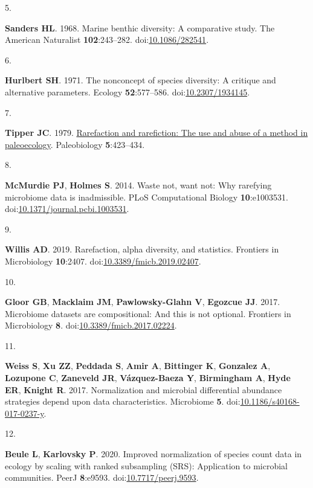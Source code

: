 \documentclass[
  11pt,
]{article}
\newlength{\cslhangindent}
\newlength{\csllabelwidth}
\newenvironment{CSLReferences}[2] %
 {\begin{list}{}{%
  \setlength{\itemindent}{0pt}
  \setlength{\leftmargin}{0pt}
  \setlength{\parsep}{0pt}
  \ifodd #1
   \setlength{\leftmargin}{\cslhangindent}
   \setlength{\itemindent}{-1\cslhangindent}
  \fi
  \setlength{\itemsep}{#2\baselineskip}}}
 {\end{list}}
\newcommand{\CSLLeftMargin}[1]{\parbox[t]{\csllabelwidth}{\strut#1\strut}}
\newcommand{\CSLRightInline}[1]{\parbox[t]{\linewidth - \csllabelwidth}{\strut#1\strut}}
\begin{document}
\begin{CSLReferences}{0}{1}
\CSLLeftMargin{5. }%
\CSLRightInline{\textbf{Sanders HL}. 1968. Marine benthic diversity: A
comparative study. The American Naturalist \textbf{102}:243--282.
doi:\href{https://doi.org/10.1086/282541}{10.1086/282541}.}

\CSLLeftMargin{6. }%
\CSLRightInline{\textbf{Hurlbert SH}. 1971. The nonconcept of species
diversity: A critique and alternative parameters. Ecology
\textbf{52}:577--586.
doi:\href{https://doi.org/10.2307/1934145}{10.2307/1934145}.}

\CSLLeftMargin{7. }%
\CSLRightInline{\textbf{Tipper JC}. 1979.
\href{http://www.jstor.org/stable/2400321}{Rarefaction and rarefiction:
The use and abuse of a method in paleoecology}. Paleobiology
\textbf{5}:423--434.}

\CSLLeftMargin{8. }%
\CSLRightInline{\textbf{McMurdie PJ}, \textbf{Holmes S}. 2014. Waste
not, want not: Why rarefying microbiome data is inadmissible. {PLoS}
Computational Biology \textbf{10}:e1003531.
doi:\href{https://doi.org/10.1371/journal.pcbi.1003531}{10.1371/journal.pcbi.1003531}.}

\CSLLeftMargin{9. }%
\CSLRightInline{\textbf{Willis AD}. 2019. Rarefaction, alpha diversity,
and statistics. Frontiers in Microbiology \textbf{10}:2407.
doi:\href{https://doi.org/10.3389/fmicb.2019.02407}{10.3389/fmicb.2019.02407}.}

\CSLLeftMargin{10. }%
\CSLRightInline{\textbf{Gloor GB}, \textbf{Macklaim JM},
\textbf{Pawlowsky-Glahn V}, \textbf{Egozcue JJ}. 2017. Microbiome
datasets are compositional: And this is not optional. Frontiers in
Microbiology \textbf{8}.
doi:\href{https://doi.org/10.3389/fmicb.2017.02224}{10.3389/fmicb.2017.02224}.}

\CSLLeftMargin{11. }%
\CSLRightInline{\textbf{Weiss S}, \textbf{Xu ZZ}, \textbf{Peddada S},
\textbf{Amir A}, \textbf{Bittinger K}, \textbf{Gonzalez A},
\textbf{Lozupone C}, \textbf{Zaneveld JR}, \textbf{Vázquez-Baeza Y},
\textbf{Birmingham A}, \textbf{Hyde ER}, \textbf{Knight R}. 2017.
Normalization and microbial differential abundance strategies depend
upon data characteristics. Microbiome \textbf{5}.
doi:\href{https://doi.org/10.1186/s40168-017-0237-y}{10.1186/s40168-017-0237-y}.}

\CSLLeftMargin{12. }%
\CSLRightInline{\textbf{Beule L}, \textbf{Karlovsky P}. 2020. Improved
normalization of species count data in ecology by scaling with ranked
subsampling (SRS): Application to microbial communities. PeerJ
\textbf{8}:e9593.
doi:\href{https://doi.org/10.7717/peerj.9593}{10.7717/peerj.9593}.}


\end{CSLReferences}
\end{document}
